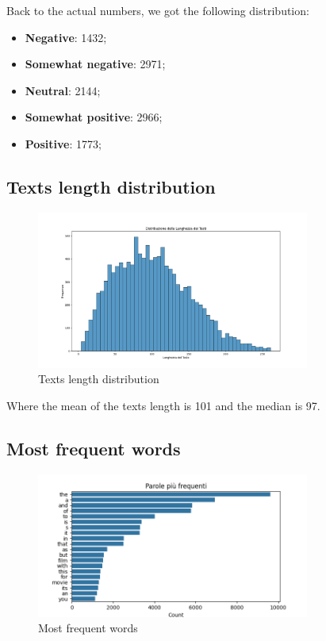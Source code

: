 Back to the actual numbers, we got the following distribution:
\begin{itemize}
	\item \textbf{Negative}: 1432;
	\item \textbf{Somewhat negative}: 2971;
	\item \textbf{Neutral}: 2144;
	\item \textbf{Somewhat positive}: 2966;
	\item \textbf{Positive}: 1773;
\end{itemize}

\subsection{Texts length distribution}

\begin{figure}[H]
	\centering
	\includegraphics[width=0.8\textwidth]{figures/text_length.png}
	\caption{Texts length distribution}
	\label{fig:text_length_distribution}
\end{figure}

Where the mean of the texts length is 101 and the median is 97.

\subsection{Most frequent words}

\begin{figure}[H]
	\centering
	\includegraphics[width=0.8\textwidth]{figures/most_frequent_words.png}
	\caption{Most frequent words}
	\label{fig:most_frequent_words}
\end{figure}

